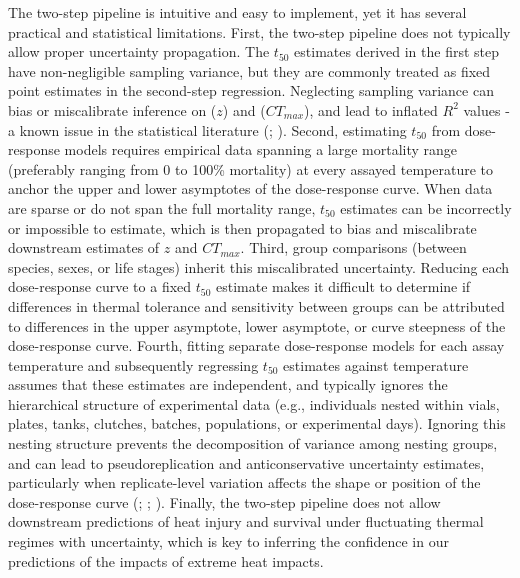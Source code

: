 \documentclass[
  11pt,
]{article}
\begin{document}
The two-step pipeline is intuitive and easy to implement, yet it has
several practical and statistical limitations. First, the two-step
pipeline does not typically allow proper uncertainty propagation. The
\(t_{50}\) estimates derived in the first step have non-negligible
sampling variance, but they are commonly treated as fixed point
estimates in the second-step regression. Neglecting sampling variance
can bias or miscalibrate inference on (\(z\)) and (\(CT_{max}\)), and
lead to inflated \(R^2\) values - a known issue in the statistical
literature (;
).
Second, estimating \(t_{50}\) from dose-response models requires
empirical data spanning a large mortality range (preferably ranging from
0 to 100\% mortality) at every assayed temperature to anchor the upper
and lower asymptotes of the dose-response curve. When data are sparse or
do not span the full mortality range, \(t_{50}\) estimates can be
incorrectly or impossible to estimate, which is then propagated to bias
and miscalibrate downstream estimates of \(z\) and \(CT_{max}\). Third,
group comparisons (between species, sexes, or life stages) inherit this
miscalibrated uncertainty. Reducing each dose-response curve to a fixed
\(t_{50}\) estimate makes it difficult to determine if differences in
thermal tolerance and sensitivity between groups can be attributed to
differences in the upper asymptote, lower asymptote, or curve steepness
of the dose-response curve. Fourth, fitting separate dose-response
models for each assay temperature and subsequently regressing \(t_{50}\)
estimates against temperature assumes that these estimates are
independent, and typically ignores the hierarchical structure of
experimental data (e.g., individuals nested within vials, plates, tanks,
clutches, batches, populations, or experimental days). Ignoring this
nesting structure prevents the decomposition of variance among nesting
groups, and can lead to pseudoreplication and anticonservative
uncertainty estimates, particularly when replicate-level variation
affects the shape or position of the dose-response curve
(;
;
). Finally,
the two-step pipeline does not allow downstream predictions of heat
injury and survival under fluctuating thermal regimes with uncertainty,
which is key to inferring the confidence in our predictions of the
impacts of extreme heat impacts.
\end{document}
